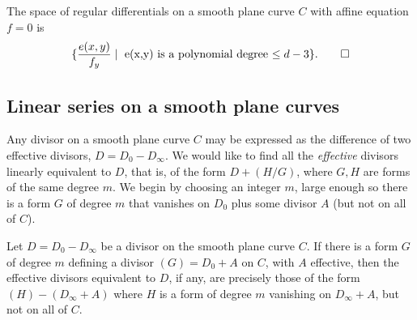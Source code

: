 \begin{theorem}
The space of regular differentials on a smooth plane curve $C$
with affine equation $f=0$ is 
$$
\{ \frac{e(x,y)}{f_{y}} \mid \hbox{ e(x,y) is a polynomial degree $\leq d-3$}\}.\qed
 $$
\end{theorem}
%
%

\subsection{Linear series on a smooth plane curves}\label{linear series on smooth plane curves}

Any divisor on a smooth plane curve $C$ may be expressed as the difference of
two effective divisors, $D= D_0-D_\infty$. We would like to find all the \emph{effective} divisors linearly equivalent to $D$, that is, of the form
$D + (H/G)$, where $G, H$ are forms of the same degree $m$. We begin by choosing
an integer $m$, large enough so there is a form $G$ of degree $m$ that vanishes on $D_0$ plus some divisor $A$ (but not on all of $C$). 

\begin{theorem}\label{equiv on smooth plane curve}
Let $D= D_0-D_\infty$ be a divisor on the smooth plane curve $C$. If
there is a form $G$ of degree $m$ defining a divisor $(G) = D_{0}+A$ on $C$, with $A$ effective, then
the effective divisors equivalent to $D$, if any, are precisely those 
of the form $(H) -(D_\infty+A)$ where $H$
is a form of degree $m$ vanishing on $D_\infty+A$, but not on all of $C$.
\end{theorem}

